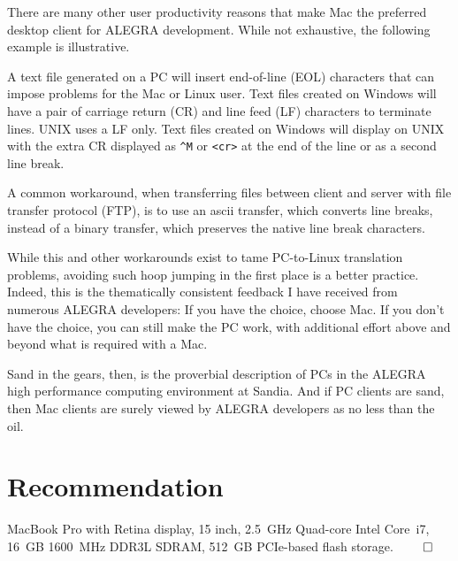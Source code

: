 \documentclass[10pt,twocolumn,reqno]{amsart}
\begin{document}
There are many other user productivity reasons that make Mac the 
preferred desktop client for ALEGRA development.  
While not exhaustive, the following example is illustrative. 

A text file generated on a PC will insert end-of-line (EOL) characters 
that can impose problems for the Mac or Linux user.  
Text files created on Windows will have a pair of 
carriage return (CR) and line feed (LF) characters 
to terminate lines.  UNIX uses a LF only.  
Text files created on Windows will display on UNIX
with the extra CR displayed as {\tt \^{}M} or {\tt <cr>} 
at the end of the line or as a second line break. 

A common workaround, when transferring files between client and 
server with file transfer protocol (FTP), is to use an ascii transfer, 
which converts line breaks, instead of a binary transfer, 
which preserves the native line break characters.

While this and other workarounds exist to tame PC-to-Linux 
translation problems, avoiding such hoop jumping in the first place 
is a better practice.  
Indeed, this is the thematically consistent feedback I have 
received from numerous ALEGRA developers:  
If you have the choice, choose Mac.  
If you don't have the choice, you can still make the PC work, 
with additional effort above and beyond what is required with a Mac.  

Sand in the gears, then, is the proverbial description of PCs in 
the ALEGRA high performance computing environment at Sandia.  
And if PC clients are sand, then Mac clients are surely viewed 
by ALEGRA developers as no less than the oil.  

\section{Recommendation}
MacBook Pro with Retina display, 15 inch, 2.5~GHz Quad-core Intel
Core~i7, 16~GB 1600~MHz DDR3L SDRAM, 512~GB PCIe-based 
flash storage. $\qed$


\end{document}

